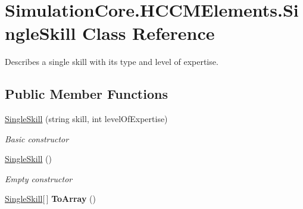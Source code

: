 \hypertarget{class_simulation_core_1_1_h_c_c_m_elements_1_1_single_skill}{}\section{Simulation\+Core.\+H\+C\+C\+M\+Elements.\+Single\+Skill Class Reference}
\label{class_simulation_core_1_1_h_c_c_m_elements_1_1_single_skill}


Describes a single skill with its type and level of expertise.  


\subsection*{Public Member Functions}
\begin{DoxyCompactItemize}
\item 
\hyperlink{class_simulation_core_1_1_h_c_c_m_elements_1_1_single_skill_a4fdb7f1d106a374c701bca2ee1dcdef9}{Single\+Skill} (string skill, int level\+Of\+Expertise)
\begin{DoxyCompactList}\small\item\em Basic constructor \end{DoxyCompactList}\item 
\hyperlink{class_simulation_core_1_1_h_c_c_m_elements_1_1_single_skill_ab59149e0df672f56ae7424ff35c0d4e1}{Single\+Skill} ()
\begin{DoxyCompactList}\small\item\em Empty constructor \end{DoxyCompactList}\item 
\hyperlink{class_simulation_core_1_1_h_c_c_m_elements_1_1_single_skill}{Single\+Skill}\mbox{[}$\,$\mbox{]} {\bfseries To\+Array} ()\hypertarget{class_simulation_core_1_1_h_c_c_m_elements_1_1_single_skill_a9627aef9a2cf07d156579ed82eb70537}{}\label{class_simulation_core_1_1_h_c_c_m_elements_1_1_single_skill_a9627aef9a2cf07d156579ed82eb70537}

\end{DoxyCompactItemize}
